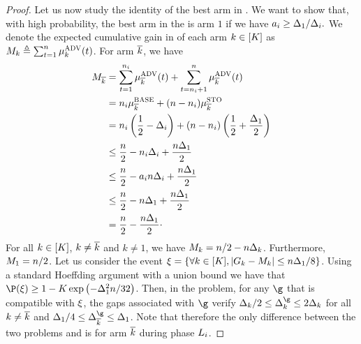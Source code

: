 \begin{proof}
	
	Let us now study the identity of the best arm in \advPro{}.
	We want to show that, with high probability, 
	the best arm in the \advPro{} is  arm $1$ if we have 
	$a_i\geq \Delta_1/ \Delta_i.$
	We denote the expected cumulative gain in \advPro{} of each 
	arm $k\in[K]$ as $M_{k}\triangleq\sum_{t=1}^{n} \mu^{\textsc{ADV}}_{k}(t)$.
	For arm $\overline k$, we have 
	\begin{align*}    
	M_{\overline k}&=
	\sum_{t=1}^{n_i} \mu^{\textsc{ADV}}_{\overline k}(t)
	+
	\sum_{t=n_i+1}^{n} \mu^{\textsc{ADV}}_{\overline k}(t)\\
	&=
	n_i \mu^{\textsc{BASE}}_{\overline k}
	+
	(n-n_i) \mu^{\textsc{STO}}_{\overline k}  \\
	&=
	n_i \left(\frac12 - \Delta_i\right)
	+
	(n-n_i) \left(\frac12 + \frac{\Delta_1}{2}\right)\\
	&\leq
	\frac{n}{2}-  n_i \Delta_i
	+
	\frac{n \Delta_1}{2}\ \\    
	&\leq    
	\frac{n}{2} - a_in \Delta_i
	+
	\frac{n \Delta_1}{2}\\\
	&\leq    
	\frac{n}{2} - n \Delta_1
	+
	\frac{n \Delta_1}{2}\\\        
	&=    
	\frac{n}{2} - \frac{n \Delta_1}{2}\cdot
	\end{align*}    
	For all $k\in[K]$, $k\neq\overline k$ and $k\neq1$, we have $M_{k}=     
	n/2 - n \Delta_k$. Furthermore, $M_{1}=     
	n/2$. 
	Let us consider the event
	$\xi =\left\{ \forall k\in[K],  |G_k-M_{k}| \leq  n \Delta_1/8 \right\}
	$.
	Using a standard Hoeffding argument with a union bound we have 
	that $\Pro(\eventc) \geq 1-\nArms\exp\left(-\gap^2_1\timeHorizon/32\right)$.
	Then, in the \advPro{} problem, for any $\gainVector$ that is 
	compatible with $\xi$, the gaps associated with $\gainVector$ 
	verify
	$\gap_k/2\leq\gap^{\gainVector}_k\leq2\gap_k$ for all $k\neq 
	\overline k$ and $\gap_1/4\leq\gap^{\gainVector}_{\refarm}\leq\gap_1$.    
	Note that therefore the only difference between the two problems 
	\stoPro{} and \advPro{} is for  arm $\overline k$ during phase $L_i$.
	

\end{proof}
